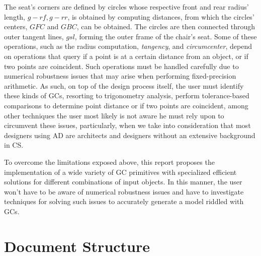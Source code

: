 The seat's corners are defined by circles whose respective front and rear
radius' length, $g-rf,g-rr$, is obtained by computing distances, from which the
circles' centers, $GFC$ and $GBC$, can be obtained.  The circles are then
connected through outer tangent lines, $gsl$, forming the outer frame of the
chair's seat.  Some of these operations, such as the radius computation,
\textit{tangency}, and \textit{circumcenter}, depend on operations that query if
a point is at a certain distance from an object, or if two points are
coincident.  Such operations must be handled carefully due to numerical
robustness issues that may arise when performing fixed-precision arithmetic.  As
such, on top of the design process itself, the user must identify these kinds of
\acp{GC}, resorting to trigonometry analysis, perform tolerance-based
comparisons to determine point distance or if two points are coincident, among
other techniques the user most likely is not aware he must rely upon to
circumvent these issues, particularly, when we take into consideration that most
designers using \ac{AD} are architects and designers without an extensive
background in \ac{CS}.

To overcome the limitations exposed above, this report proposes the
implementation of a wide variety of \ac{GC} primitives with
specialized efficient solutions for different combinations of input objects.  In
this manner, the user won't have to be aware of numerical robustness issues and
have to investigate techniques for solving such issues to accurately generate a
model riddled with \acp{GC}.

\section{Document Structure}%
\label{sec:intro.structure}

